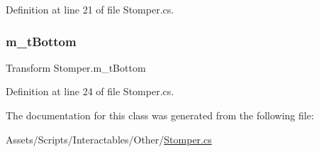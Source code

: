 Definition at line 21 of file Stomper.\+cs.

\mbox{\label{class_stomper_aa2600c8a8e29d398ffe137de4758778c}} 
\subsubsection{\texorpdfstring{m\+\_\+t\+Bottom}{m\_tBottom}}
{\footnotesize\ttfamily Transform Stomper.\+m\+\_\+t\+Bottom}



Definition at line 24 of file Stomper.\+cs.



The documentation for this class was generated from the following file\+:\begin{DoxyCompactItemize}
\item 
Assets/\+Scripts/\+Interactables/\+Other/\mbox{\hyperlink{_stomper_8cs}{Stomper.\+cs}}\end{DoxyCompactItemize}
